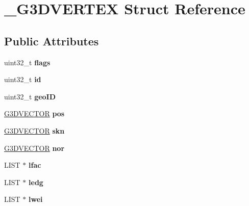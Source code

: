 \hypertarget{struct__G3DVERTEX}{}\section{\+\_\+\+G3\+D\+V\+E\+R\+T\+EX Struct Reference}
\label{struct__G3DVERTEX}
\subsection*{Public Attributes}
\begin{DoxyCompactItemize}
\item 
\mbox{\label{struct__G3DVERTEX_a516df262e47e5e2e16a25adc91cbb263}} 
uint32\+\_\+t {\bfseries flags}
\item 
\mbox{\label{struct__G3DVERTEX_a5a786c47a2603b5737a620012f33de37}} 
uint32\+\_\+t {\bfseries id}
\item 
\mbox{\label{struct__G3DVERTEX_aab786b0fc1b11fd97f7991d2a37c9bb5}} 
uint32\+\_\+t {\bfseries geo\+ID}
\item 
\mbox{\label{struct__G3DVERTEX_af140cffb7fb2e5c259d87125422c45c3}} 
\hyperlink{structG3DVECTOR}{G3\+D\+V\+E\+C\+T\+OR} {\bfseries pos}
\item 
\mbox{\label{struct__G3DVERTEX_ac4e5b321819929ab06f675a90496204b}} 
\hyperlink{structG3DVECTOR}{G3\+D\+V\+E\+C\+T\+OR} {\bfseries skn}
\item 
\mbox{\label{struct__G3DVERTEX_ae991d8a4b95bcfd08eb9cda1cc8f8aa1}} 
\hyperlink{structG3DVECTOR}{G3\+D\+V\+E\+C\+T\+OR} {\bfseries nor}
\item 
\mbox{\label{struct__G3DVERTEX_a3018a6aeb70c6ac12a52a0dbb5094d67}} 
L\+I\+ST $\ast$ {\bfseries lfac}
\item 
\mbox{\label{struct__G3DVERTEX_a16cfead1dfdbe10891929971ed845762}} 
L\+I\+ST $\ast$ {\bfseries ledg}
\item 
\mbox{\label{struct__G3DVERTEX_af5e6208bfb2b69e7ca3049f05103f1a5}} 
L\+I\+ST $\ast$ {\bfseries lwei}

\end{DoxyCompactItemize}
